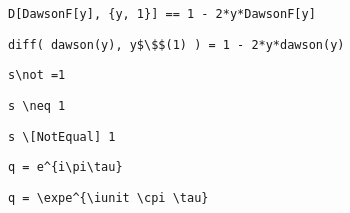 \newsavebox\AXMM
\begin{lrbox}{\AXMM}
 \begin{minipage}[t]{0.82\textwidth}
  \lstinline[language={[latex]TeX},mathescape,breaklines=true]"D[DawsonF[y], {y, 1}] == 1 - 2*y*DawsonF[y]"
 \end{minipage}
\end{lrbox}
\newsavebox\AXMA
\begin{lrbox}{\AXMA}
 \begin{minipage}[t]{0.82\textwidth}
  \lstinline[language={[latex]TeX},mathescape,breaklines=true]"diff( dawson(y), y$\$$(1) ) = 1 - 2*y*dawson(y)"
 \end{minipage}
\end{lrbox}
\newsavebox\AYT
\begin{lrbox}{\AYT}
 \begin{minipage}[t]{0.82\textwidth}
  \lstinline[language={[latex]TeX},mathescape,breaklines=true]"s\not =1"
 \end{minipage}
\end{lrbox}
\newsavebox\AYST
\begin{lrbox}{\AYST}
 \begin{minipage}[t]{0.82\textwidth}
  \lstinline[language={[latex]TeX},mathescape,breaklines=true]"s \neq 1"
 \end{minipage}
\end{lrbox}
\newsavebox\AYMM
\begin{lrbox}{\AYMM}
 \begin{minipage}[t]{0.82\textwidth}
  \lstinline[language={[latex]TeX},mathescape,breaklines=true]"s \[NotEqual] 1"
 \end{minipage}
\end{lrbox}
\newsavebox\AYMA
\begin{lrbox}{\AYMA}
 \begin{minipage}[t]{0.82\textwidth}
  \lstinline[language={[latex]TeX},mathescape,breaklines=true]""
 \end{minipage}
\end{lrbox}
\newsavebox\AZT
\begin{lrbox}{\AZT}
 \begin{minipage}[t]{0.82\textwidth}
  \lstinline[language={[latex]TeX},mathescape,breaklines=true]"q = e^{i\pi\tau}"
 \end{minipage}
\end{lrbox}
\newsavebox\AZST
\begin{lrbox}{\AZST}
 \begin{minipage}[t]{0.82\textwidth}
  \lstinline[language={[latex]TeX},mathescape,breaklines=true]"q = \expe^{\iunit \cpi \tau}"
 \end{minipage}
\end{lrbox}
